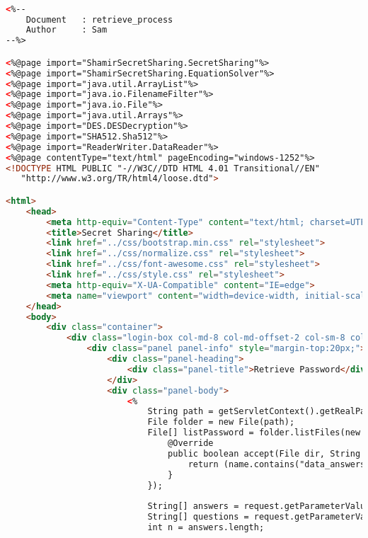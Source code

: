 \begin{lstlisting}[language=html,basicstyle=\tiny,caption=retrieve.jsp]
\end{lstlisting}

\begin{lstlisting}[language=html,basicstyle=\tiny,caption=retrieve\_process.jsp]

<%-- 
    Document   : retrieve_process
    Author     : Sam
--%>

<%@page import="ShamirSecretSharing.SecretSharing"%>
<%@page import="ShamirSecretSharing.EquationSolver"%>
<%@page import="java.util.ArrayList"%>
<%@page import="java.io.FilenameFilter"%>
<%@page import="java.io.File"%>
<%@page import="java.util.Arrays"%>
<%@page import="DES.DESDecryption"%>
<%@page import="SHA512.Sha512"%>
<%@page import="ReaderWriter.DataReader"%>
<%@page contentType="text/html" pageEncoding="windows-1252"%>
<!DOCTYPE HTML PUBLIC "-//W3C//DTD HTML 4.01 Transitional//EN"
   "http://www.w3.org/TR/html4/loose.dtd">

<html>
    <head>
        <meta http-equiv="Content-Type" content="text/html; charset=UTF-8">
        <title>Secret Sharing</title>
        <link href="../css/bootstrap.min.css" rel="stylesheet">
        <link href="../css/normalize.css" rel="stylesheet">
        <link href="../css/font-awesome.css" rel="stylesheet">
        <link href="../css/style.css" rel="stylesheet">
        <meta http-equiv="X-UA-Compatible" content="IE=edge">
        <meta name="viewport" content="width=device-width, initial-scale=1">
    </head>
    <body>
        <div class="container">
            <div class="login-box col-md-8 col-md-offset-2 col-sm-8 col-sm-offset-2">
                <div class="panel panel-info" style="margin-top:20px;">
                    <div class="panel-heading">
                        <div class="panel-title">Retrieve Password</div>
                    </div>
                    <div class="panel-body">
                        <%
                            String path = getServletContext().getRealPath("data");
                            File folder = new File(path);
                            File[] listPassword = folder.listFiles(new FilenameFilter() {
                                @Override
                                public boolean accept(File dir, String name) {
                                    return (name.contains("data_answers") && name.endsWith(".txt")) && (!name.contains("case"));
                                }
                            });
                            
                            String[] answers = request.getParameterValues("answer");
                            String[] questions = request.getParameterValues("questions");
                            int n = answers.length;


\end{lstlisting}
